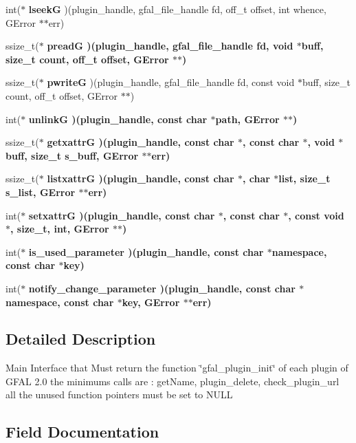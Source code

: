 \begin{CompactItemize}
\item 
int($\ast$ \textbf{lseek\-G} )(plugin\_\-handle, gfal\_\-file\_\-handle fd, off\_\-t offset, int whence, GError $\ast$$\ast$err)\label{struct__gfal__plugin__interface_424d4d77e29e5e4cfe92eae0d6a8bdc2}

\item 
ssize\_\-t($\ast$ \bf{pread\-G} )(plugin\_\-handle, gfal\_\-file\_\-handle fd, void $\ast$buff, size\_\-t count, off\_\-t offset, GError $\ast$$\ast$)
\item 
ssize\_\-t($\ast$ \textbf{pwrite\-G} )(plugin\_\-handle, gfal\_\-file\_\-handle fd, const void $\ast$buff, size\_\-t count, off\_\-t offset, GError $\ast$$\ast$)\label{struct__gfal__plugin__interface_6de31ed116e6223b75fd068a1bd66779}

\item 
int($\ast$ \bf{unlink\-G} )(plugin\_\-handle, const char $\ast$path, GError $\ast$$\ast$)
\item 
ssize\_\-t($\ast$ \bf{getxattr\-G} )(plugin\_\-handle, const char $\ast$, const char $\ast$, void $\ast$buff, size\_\-t s\_\-buff, GError $\ast$$\ast$err)
\item 
ssize\_\-t($\ast$ \bf{listxattr\-G} )(plugin\_\-handle, const char $\ast$, char $\ast$list, size\_\-t s\_\-list, GError $\ast$$\ast$err)
\item 
int($\ast$ \bf{setxattr\-G} )(plugin\_\-handle, const char $\ast$, const char $\ast$, const void $\ast$, size\_\-t, int, GError $\ast$$\ast$)
\item 
int($\ast$ \bf{is\_\-used\_\-parameter} )(plugin\_\-handle, const char $\ast$namespace, const char $\ast$key)
\item 
int($\ast$ \bf{notify\_\-change\_\-parameter} )(plugin\_\-handle, const char $\ast$namespace, const char $\ast$key, GError $\ast$$\ast$err)
\end{CompactItemize}


\subsection{Detailed Description}
Main Interface that Must return the function \char`\"{}gfal\_\-plugin\_\-init\char`\"{} of each plugin of GFAL 2.0 the minimums calls are : get\-Name, plugin\_\-delete, check\_\-plugin\_\-url all the unused function pointers must be set to NULL 



\subsection{Field Documentation}
